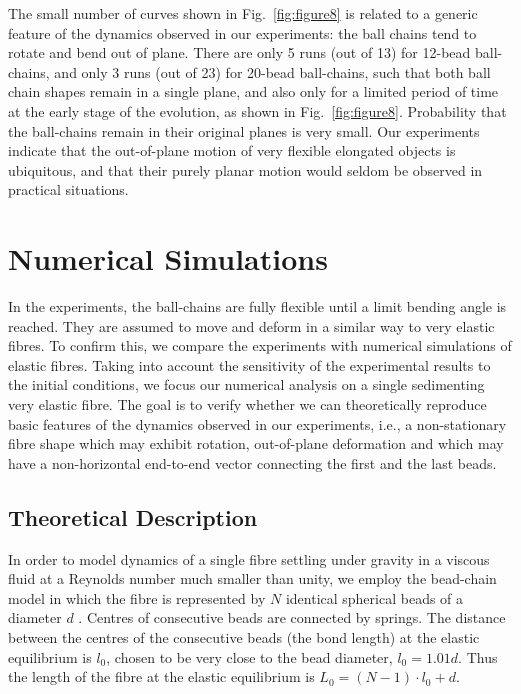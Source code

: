 \documentclass{article}
\begin{document}
The small number of curves shown in Fig.~\ref{fig:figure8} is related to a generic feature of the dynamics observed in our experiments: the ball chains tend to rotate and bend out of plane.  
There are only 5 runs (out of 13) for 12-bead ball-chains, and only
3 runs (out of 23) for 20-bead ball-chains, such that both ball chain shapes remain in a single plane, and also only for a limited period of time at the early stage of the evolution, as shown in Fig.~\ref{fig:figure8}. 
Probability that the ball-chains remain in their original planes is very small.
Our experiments indicate that the out-of-plane motion of very flexible elongated objects is ubiquitous, and that their purely planar motion %
would seldom be observed in practical situations. 

\section{Numerical Simulations}
In the experiments, the ball-chains are fully flexible until a limit bending angle is reached. They are %
assumed to move and deform in a similar way %
to very elastic fibres. To confirm this, we compare the experiments with numerical simulations of elastic fibres. Taking into account the sensitivity of the experimental results to the initial conditions, we focus our numerical analysis on a single sedimenting very elastic fibre.
The goal is to verify whether we can theoretically reproduce basic features of the dynamics observed in our experiments, i.e., a non-stationary fibre shape
which may exhibit rotation, out-of-plane deformation and 
which may have 
a non-horizontal end-to-end vector connecting the first and the last beads.

\subsection{
Theoretical Description %
}

In order to model dynamics of a single fibre settling under gravity in a viscous fluid at a Reynolds number much smaller than unity, we employ the bead-chain model in which the fibre is represented by $N$ identical spherical beads of a diameter $d$ \cite{gauger_numerical_2006}. Centres of %
consecutive %
beads are connected by springs. %
The distance between the centres of the consecutive beads (the bond length) at the elastic equilibrium %
 is $l_0$, chosen to be very close to the bead diameter, $l_0=1.01 d$. Thus the %
length of the fibre at the elastic equilibrium is $L_0=(N-1) \cdot l_0 + d$.
\end{document}
